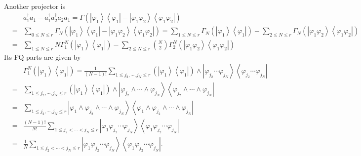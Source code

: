 \documentclass[12pt]{article}
\begin{document}
Another projector is 
\begin{eqnarray*}
&&a_{1}^{\dagger }a_{1}-a_{1}^{\dagger }a_{2}^{\dagger }a_{2}a_{1}=\Gamma
\left( \left\vert \varphi _{1}\right\rangle \left\langle \varphi
_{1}\right\vert -\left\vert \varphi _{1}\varphi _{2}\right\rangle
\left\langle \varphi _{1}\varphi _{2}\right\vert \right) \\
&=&\sum_{0\leq N\leq r}\Gamma _{N}\left( \left\vert \varphi
_{1}\right\rangle \left\langle \varphi _{1}\right\vert -\left\vert \varphi
_{1}\varphi _{2}\right\rangle \left\langle \varphi _{1}\varphi
_{2}\right\vert \right) =\sum_{1\leq N\leq r}\Gamma _{N}\left( \left\vert
\varphi _{1}\right\rangle \left\langle \varphi _{1}\right\vert \right)
-\sum_{2\leq N\leq r}\Gamma _{N}\left( \left\vert \varphi _{1}\varphi
_{2}\right\rangle \left\langle \varphi _{1}\varphi _{2}\right\vert \right) \\
&=&\sum_{1\leq N\leq r}N\Gamma _{1}^{N}\left( \left\vert \varphi
_{1}\right\rangle \left\langle \varphi _{1}\right\vert \right) -\sum_{2\leq
N\leq r}\binom{N}{2}\Gamma _{2}^{N}\left( \left\vert \varphi _{1}\varphi
_{2}\right\rangle \left\langle \varphi _{1}\varphi _{2}\right\vert \right)
\end{eqnarray*}%
Its FQ parts are given by 
\begin{eqnarray*}
&&\Gamma _{1}^{N}\left( \left\vert \varphi _{1}\right\rangle \left\langle
\varphi _{1}\right\vert \right) =\frac{1}{\left( N-1\right) !}\sum_{1\leq
j_{2},\cdots ,j_{N}\leq r}\left( \left\vert \varphi _{1}\right\rangle
\left\langle \varphi _{1}\right\vert \right) \wedge \left\vert \varphi
_{j_{2}}\cdots \varphi _{j_{N}}\right\rangle \left\langle \varphi
_{j_{2}}\cdots \varphi _{j_{N}}\right\vert \\
&=&\sum_{1\leq j_{2},\cdots ,j_{N}\leq r}\left( \left\vert \varphi
_{1}\right\rangle \left\langle \varphi _{1}\right\vert \right) \wedge
\left\vert \varphi _{j_{2}}\wedge \cdots \wedge \varphi
_{j_{N}}\right\rangle \left\langle \varphi _{j_{2}}\wedge \cdots \wedge
\varphi _{j_{N}}\right\vert \\
&=&\sum_{1\leq j_{2},\cdots ,j_{N}\leq r}\left\vert \varphi _{1}\wedge
\varphi _{j_{2}}\wedge \cdots \wedge \varphi _{j_{N}}\right\rangle
\left\langle \varphi _{1}\wedge \varphi _{j_{2}}\wedge \cdots \wedge \varphi
_{j_{N}}\right\vert \\
&=&\frac{\left( N-1\right) !}{N!}\sum_{1\leq j_{2}<\cdots <j_{N}\leq
r}\left\vert \varphi _{1}\varphi _{j_{2}}\cdots \varphi
_{j_{N}}\right\rangle \left\langle \varphi _{1}\varphi _{j_{2}}\cdots
\varphi _{j_{N}}\right\vert \\
&=&\frac{1}{N}\sum_{1\leq j_{2}<\cdots <j_{N}\leq r}\left\vert \varphi
_{1}\varphi _{j_{2}}\cdots \varphi _{j_{N}}\right\rangle \left\langle
\varphi _{1}\varphi _{j_{2}}\cdots \varphi _{j_{N}}\right\vert .
\end{eqnarray*}%
\end{document}

